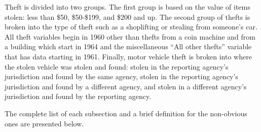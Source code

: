 \documentclass[
  12pt,
  openany]{book}
\begin{document}
Theft is divided into two groups. The first group is based on the value of items stolen: less than \$50, \$50-\$199, and \$200 and up. The second group of thefts is broken into the type of theft such as a shoplifting or stealing from someone's car. All theft variables begin in 1960 other than thefts from a coin machine and from a building which start in 1964 and the miscellaneous ``All other thefts'' variable that has data starting in 1961. Finally, motor vehicle theft is broken into where the stolen vehicle was stolen and found: stolen in the reporting agency's jurisdiction and found by the same agency, stolen in the reporting agency's jurisdiction and found by a different agency, and stolen in a different agency's jurisdiction and found by the reporting agency.

The complete list of each subsection and a brief definition for the non-obvious ones are presented below.
\end{document}
